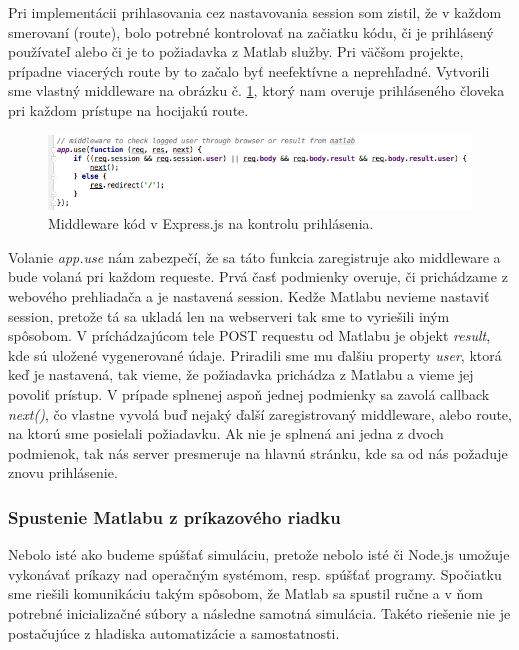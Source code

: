 Pri implementácii prihlasovania cez nastavovania session som zistil, že v každom smerovaní (route), bolo potrebné kontrolovať na začiatku kódu, či je prihlásený používateľ alebo či je to požiadavka z Matlab služby. Pri väčšom projekte, prípadne viacerých route by to začalo byť neefektívne a neprehľadné. Vytvorili sme vlastný middleware na obrázku č. \ref{img-express-middleware}, ktorý nam overuje prihláseného človeka pri každom prístupe na hocijakú route.

\begin{figure}[H]
  \centering
  \includegraphics[scale=0.6]{img/code/express-middleware.png}
  \caption{Middleware kód v Express.js na kontrolu prihlásenia.}
  \label{img-express-middleware}
\end{figure}

Volanie \textit{app.use} nám zabezpečí, že sa táto funkcia zaregistruje ako middleware a bude volaná pri každom requeste. Prvá časť podmienky overuje, či prichádzame z webového prehliadača a je nastavená session. Kedže Matlabu nevieme nastaviť session, pretože tá sa ukladá len na webserveri tak sme to vyriešili iným spôsobom. V príchádzajúcom tele POST requestu od Matlabu je objekt \textit{result}, kde sú uložené vygenerované údaje. Priradili sme mu ďalšiu property \textit{user}, ktorá keď je nastavená, tak vieme, že požiadavka prichádza z Matlabu a vieme jej povoliť prístup. V prípade splnenej aspoň jednej podmienky sa zavolá callback \textit{next()}, čo vlastne vyvolá buď nejaký ďalší zaregistrovaný middleware, alebo route, na ktorú sme posielali požiadavku.
Ak nie je splnená ani jedna z dvoch podmienok, tak nás server presmeruje na hlavnú stránku, kde sa od nás požaduje znovu prihlásenie.


\subsubsection{Spustenie Matlabu z príkazového riadku}
Nebolo isté ako budeme spúšťať simuláciu, pretože nebolo isté či Node.js umožuje vykonávať príkazy nad operačným systémom, resp. spúšťať programy. Spočiatku sme riešili komunikáciu takým spôsobom, že Matlab sa spustil ručne a v ňom potrebné inicializačné súbory a následne samotná simulácia. Takéto riešenie nie je postačujúce z hladiska automatizácie a samostatnosti.

